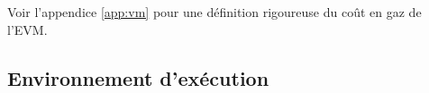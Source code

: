 \documentclass[9pt,oneside]{amsart}
\begin{document}
\begin{multicols}{2}
%
%

Voir l'appendice \ref{app:vm} pour une définition rigoureuse du coût en gaz de l'EVM.


\subsection{Environnement d'exécution}


\end{multicols}
\end{document}
